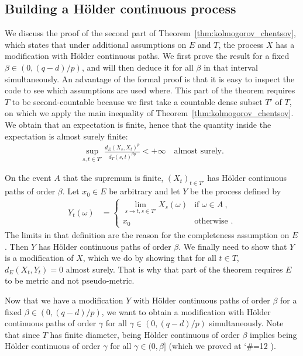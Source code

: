 \documentclass[lean]{Draft}
\makeatletter
\newcommand\leanlink{\begingroup\catcode`\#=12\relax\@leanlink}
\newcommand\@leanlink[2]{\endgroup
\href{#1}
{\texttt{\detokenize{#2}}}}
\newcommand{\docs}[1]{%
\leanlink{https://remydegenne.github.io/brownian-motion/docs/find/?pattern=#1\#doc}
{#1}}
\makeatother
\begin{document}
\subsection{Building a Hölder continuous process}
\label{sub:holder_process}

We discuss the proof of the second part of Theorem~\ref{thm:kolmogorov_chentsov}, which states that under additional assumptions on $E$ and $T$, the process $X$ has a modification with Hölder continuous paths.
We first prove the result for a fixed $\beta \in (0, (q - d)/p)$, and will then deduce it for all $\beta$ in that interval simultaneously.
An advantage of the formal proof is that it is easy to inspect the code to see which assumptions are used where.
This part of the theorem requires $T$ to be second-countable because we first take a countable dense subset $T'$ of $T$, on which we apply the main inequality of Theorem~\ref{thm:kolmogorov_chentsov}.
We obtain that an expectation is finite, hence that the quantity inside the expectation is almost surely finite:
\begin{align*}
  \sup_{s, t \in T'} \frac{d_E(X_s, X_t)^p}{d_T(s, t)^{\beta p}} < +\infty
  \quad \text{almost surely.}
\end{align*}

On the event $A$ that the supremum is finite, $(X_t)_{t \in T'}$ has Hölder continuous paths of order $\beta$.
Let $x_0 \in E$ be arbitrary and let $Y$ be the process defined by
\begin{align*}
  Y_t(\omega)
  &= \begin{cases}
    \lim_{s \to t, s \in T'} X_s(\omega) & \text{if } \omega \in A \: , \\
    x_0 & \text{otherwise .}
  \end{cases}
\end{align*}
The limits in that definition are the reason for the completeness assumption on $E$.
Then $Y$ has Hölder continuous paths of order $\beta$.
We finally need to show that $Y$ is a modification of $X$, which we do by showing that for all $t \in T$, $d_E(X_t, Y_t) = 0$ almost surely.
That is why that part of the theorem requires $E$ to be metric and not pseudo-metric.


Now that we have a modification $Y$ with Hölder continuous paths of order $\beta$ for a fixed $\beta \in (0, (q - d)/p)$, we want to obtain a modification with Hölder continuous paths of order $\gamma$ for all $\gamma \in (0, (q - d)/p)$ simultaneously.
Note that since $T$ has finite diameter, being Hölder continuous of order $\beta$ implies being Hölder continuous of order $\gamma$ for all $\gamma \in (0, \beta]$ (which we proved at \docs{HolderOnWith.mono_right}).
\end{document}
